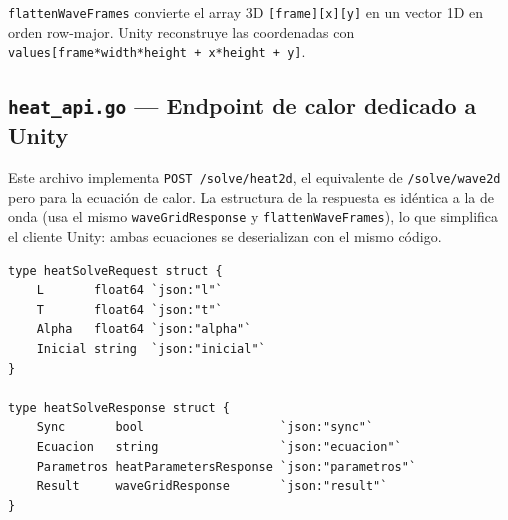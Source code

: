 \documentclass[12pt, a4paper]{article}
\begin{document}
\texttt{flattenWaveFrames} convierte el array 3D \texttt{[frame][x][y]} en un vector
1D en orden row-major. Unity reconstruye las coordenadas con
\texttt{values[frame*width*height + x*height + y]}.

\subsection{\texttt{heat\_api.go} — Endpoint de calor dedicado a Unity}

Este archivo implementa \texttt{POST /solve/heat2d}, el equivalente de
\texttt{/solve/wave2d} pero para la ecuación de calor. La estructura de la respuesta es
idéntica a la de onda (usa el mismo \texttt{waveGridResponse} y \texttt{flattenWaveFrames}),
lo que simplifica el cliente Unity: ambas ecuaciones se deserializan con el mismo
código.

\begin{lstlisting}[style=golang, caption={Estructuras de entrada y salida para la ecuación de calor}]
type heatSolveRequest struct {
    L       float64 `json:"l"`
    T       float64 `json:"t"`
    Alpha   float64 `json:"alpha"`
    Inicial string  `json:"inicial"`
}

type heatSolveResponse struct {
    Sync       bool                   `json:"sync"`
    Ecuacion   string                 `json:"ecuacion"`
    Parametros heatParametersResponse `json:"parametros"`
    Result     waveGridResponse       `json:"result"`
}
\end{lstlisting}
\end{document}
